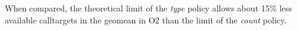 When compared, the theoretical limit of the \textit{type} policy allows about 15\% less available calltargets in the geomean in O2 than the limit of the \textit{count} policy.

%
%
%	
%
%
%
%	
%	
